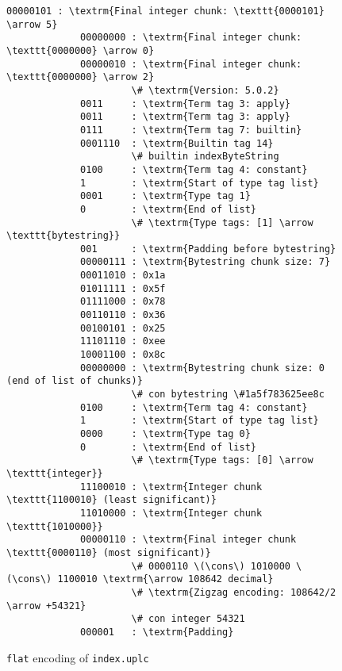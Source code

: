 \begin{figure}[H]
  \centering
  {\small  
        \begin{Verbatim}[commandchars=\\\{\}]
             00000101 : \textrm{Final integer chunk: \texttt{0000101} \arrow 5}
             00000000 : \textrm{Final integer chunk: \texttt{0000000} \arrow 0}
             00000010 : \textrm{Final integer chunk: \texttt{0000000} \arrow 2}
                      \# \textrm{Version: 5.0.2}
             0011     : \textrm{Term tag 3: apply}
             0011     : \textrm{Term tag 3: apply}
             0111     : \textrm{Term tag 7: builtin}
             0001110  : \textrm{Builtin tag 14}
                      \# builtin indexByteString
             0100     : \textrm{Term tag 4: constant}
             1        : \textrm{Start of type tag list}
             0001     : \textrm{Type tag 1}
             0        : \textrm{End of list}
                      \# \textrm{Type tags: [1] \arrow \texttt{bytestring}}
             001      : \textrm{Padding before bytestring}
             00000111 : \textrm{Bytestring chunk size: 7}
             00011010 : 0x1a
             01011111 : 0x5f
             01111000 : 0x78
             00110110 : 0x36
             00100101 : 0x25
             11101110 : 0xee
             10001100 : 0x8c
             00000000 : \textrm{Bytestring chunk size: 0 (end of list of chunks)}
                      \# con bytestring \#1a5f783625ee8c
             0100     : \textrm{Term tag 4: constant}
             1        : \textrm{Start of type tag list}
             0000     : \textrm{Type tag 0}
             0        : \textrm{End of list}
                      \# \textrm{Type tags: [0] \arrow \texttt{integer}}
             11100010 : \textrm{Integer chunk \texttt{1100010} (least significant)}
             11010000 : \textrm{Integer chunk \texttt{1010000}}
             00000110 : \textrm{Final integer chunk \texttt{0000110} (most significant)}
                      \# 0000110 \(\cons\) 1010000 \(\cons\) 1100010 \textrm{\arrow 108642 decimal}
                      \# \textrm{Zigzag encoding: 108642/2 \arrow +54321}
                      \# con integer 54321
             000001   : \textrm{Padding}
        \end{Verbatim}
        }
      \caption{\texttt{flat} encoding of \texttt{index.uplc}}
      \label{fig:index-bytestring-example}
  \end{figure}

